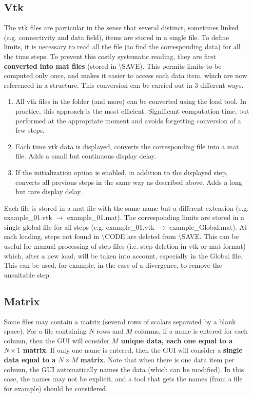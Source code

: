 \documentclass{article}
\begin{document}
\subsection{Vtk}

The vtk files are particular in the sense that several distinct, sometimes linked (e.g. connectivity and data field), items are stored in a single file. To define limits, it is necessary to read all the file (to find the corresponding data) for all the time steps. To prevent this costly systematic reading, they are first \textbf{converted into mat files} (stored in \textbackslash SAVE). This permits limits to be computed only once, and makes it easier to access each data item, which are now referenced in a structure. This conversion can be carried out in 3 different ways.

\begin{enumerate}
    \item All vtk files in the folder (and more) can be converted using the load tool. In practice, this approach is the most efficient. Significant computation time, but performed at the appropriate moment and avoids forgetting conversion of a few steps.
    \item Each time vtk data is displayed, converts the corresponding file into a mat file. Adds a small but continuous display delay.
    \item If the initialization option is enabled, in addition to the displayed step, converts all previous steps in the same way as described above. Adds a long but rare display delay.
\end{enumerate}

Each file is stored in a mat file with the same name but a different extension (e.g. example\_01.vtk $\rightarrow$ example\_01.mat). The corresponding limits are stored in a single global file for all steps (e.g. example\_01.vtk $\rightarrow$ example\_Global.mat). At each loading, steps not found in \textbackslash CODE are deleted from \textbackslash SAVE. This can be useful for manual processing of step files (i.e. step deletion in vtk or mat format) which, after a new load, will be taken into account, especially in the Global file. This can be used, for example, in the case of a divergence, to remove the unsuitable step.

\subsection{Matrix}

Some files may contain a matrix (several rows of scalars separated by a blank space). For a file containing $N$ rows and $M$ columns, if a name is entered for each column, then the GUI will consider \textbf{$M$ unique data, each one equal to a $N \times 1$ matrix}. If only one name is entered, then the GUI will consider a \textbf{single data equal to a $N \times M$ matrix}. Note that when there is one data item per column, the GUI automatically names the data (which can be modified). In this case, the names may not be explicit, and a tool that gets the names (from a file for example) should be considered.
\end{document}
